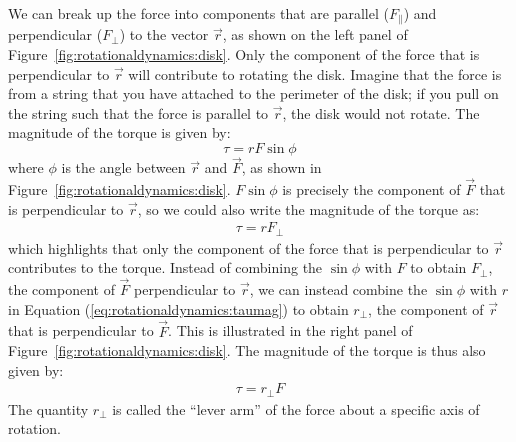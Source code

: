 We can break up the force into components that are parallel ($F_\parallel$) and perpendicular ($F_\perp$) to the vector $\vec r$, as shown on the left panel of Figure~\ref{fig:rotationaldynamics:disk}. Only the component of the force that is perpendicular to $\vec r$ will contribute to rotating the disk. Imagine that the force is from a string that you have attached to the perimeter of the disk; if you pull on the string such that the force is parallel to $\vec r$, the disk would not rotate. The magnitude of the torque is given by:
\begin{equation}
\label{eq:rotationaldynamics:taumag}
\tau = rF\sin\phi
\end{equation}
where $\phi$ is the angle between $\vec r$ and $\vec F$, as shown in Figure~\ref{fig:rotationaldynamics:disk}. $F \sin \phi$ is precisely the component of $\vec F$ that is perpendicular to $\vec r$, so we could also write the magnitude of the torque as:
\begin{align*}
\tau =rF_\perp
\end{align*}
which highlights that only the component of the force that is perpendicular to $\vec r$ contributes to the torque. Instead of combining the $\sin \phi$ with $F$ to obtain $F_\perp$, the component of $\vec F$ perpendicular to $\vec r$, we can instead combine the $\sin \phi$ with $r$ in Equation (\ref{eq:rotationaldynamics:taumag}) to obtain $r_\perp$, the component of $\vec r$ that is perpendicular to $\vec F$. This is illustrated in the right panel of Figure~\ref{fig:rotationaldynamics:disk}. The magnitude of the torque is thus also given by:
\begin{align*}
\tau =r_\perp F
\end{align*}
The quantity $r_\perp$ is called the ``lever arm'' of the force about a specific axis of rotation.

